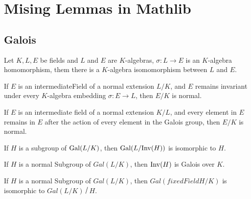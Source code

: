 \chapter{Mising Lemmas in Mathlib}

\section{Galois}

\begin{lemma}
	\leanok
	Let $ K, L, E $ be fields and $ L $ and $ E $ are $ K $-algebras, $\sigma : L \to E $ is an $ K $-algebra homomorphism, them there is a $ K $-algebra isomomorphism between $ L $ and $ E $.
\end{lemma}

\begin{lemma}
	\leanok
	If $E$ is an intermediateField of a normal extension $L / K$, and $E$ remains invariant under every $K$-algebra embedding $\sigma : E \to L$, then $E / K$ is normal.
\end{lemma}

\begin{theorem}
	\leanok
	If $E$ is an intermediate field of a normal extension $K / L$, and every element in $E$ remains in $E$ after the action of every element in the Galois group, then $E / K$ is normal.
\end{theorem}

\begin{theorem}
	\leanok
	If $H$ is a subgroup of $\mathrm{Gal}(L/K)$, then $\mathrm{Gal}(L / \mathrm{Inv} (H))$ is isomorphic to $H$.
\end{theorem}

\begin{theorem}
	\leanok
	If $H$ is a normal Subgroup of $Gal(L/K)$, then $\mathrm{Inv} (H)$ is Galois over $K$.
\end{theorem}

\begin{theorem}
	\leanok
	If $H$ is a normal Subgroup of $Gal(L / K)$, then $Gal(fixedField H / K)$ is isomorphic to $Gal(L / K) ⧸ H$.
\end{theorem}

